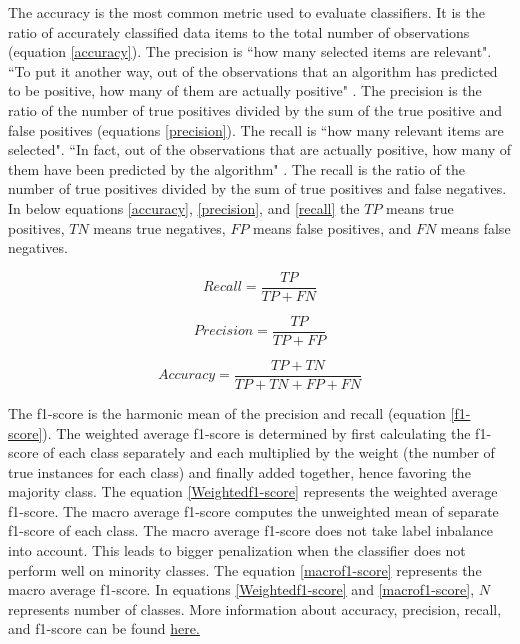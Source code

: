 The accuracy is the most common metric used to evaluate classifiers. It is the ratio of accurately classified data items to the total number of observations (equation \ref{accuracy}). The precision is ``how many selected items are relevant". ``To put it another way, out of the observations that an algorithm has predicted to be positive, how many of them are actually positive" \cite{vakili2020performance}. The precision is the ratio of the number of true positives divided by the sum of the true positive and false positives (equations \ref{precision}). The recall is ``how many relevant items are selected". ``In fact, out of the observations that are actually positive, how many of them have been predicted by the algorithm" \cite{vakili2020performance}. The recall is the ratio of the number of true positives divided by the sum of true positives and false negatives. In below equations \ref{accuracy}, \ref{precision}, and \ref{recall} the $TP$ means true positives, $TN$ means true negatives, $FP$ means false positives, and $FN$ means false negatives.



\begin{equation}\label{recall}
\textit{Recall} = \frac{TP}{TP + FN}
\end{equation}

\begin{equation}\label{precision}
\textit{Precision} = \frac{TP}{TP + FP}
\end{equation}


\begin{equation}\label{accuracy}
\textit{Accuracy} = \frac{TP + TN}{TP +TN+ FP + FN}
\end{equation}

The f1-score is the harmonic mean of the precision and recall (equation \ref{f1-score}). The weighted average f1-score is determined by first calculating the f1-score of each class separately and each multiplied by the weight (the number of true instances for each class) and finally added together, hence favoring the majority class. The equation \ref{Weightedf1-score} represents the weighted average f1-score. The macro average f1-score computes the unweighted mean of separate f1-score of each class. The macro average f1-score does not take label inbalance into account. This leads to bigger penalization when the classifier does not perform well on minority classes. The equation \ref{macrof1-score} represents the macro average f1-score. In equations \ref{Weightedf1-score} and \ref{macrof1-score}, $N$ represents number of classes. More information about accuracy, precision, recall, and f1-score can be found \href{https://en.wikipedia.org/wiki/Precision_and_recall}{here\footnotemark.}


